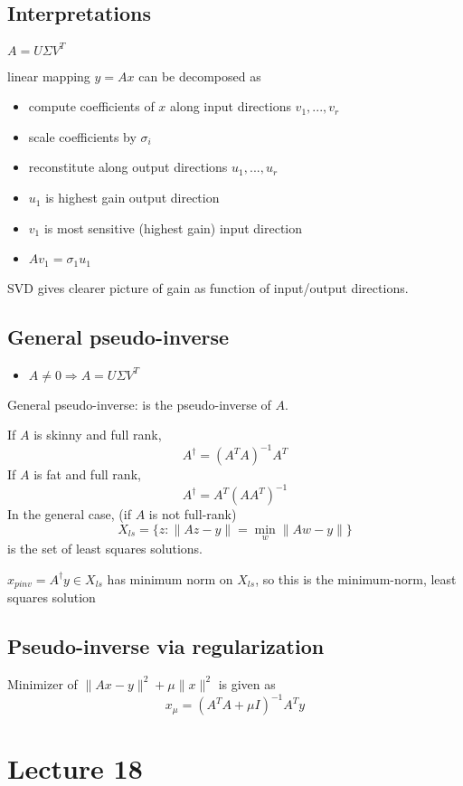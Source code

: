 \documentclass[10pt,letterpaper]{article}
\begin{document}
\subsection{Interpretations}
\label{sec-16_3}

$A = U \Sigma V ^{T}$

linear mapping $y=Ax$ can be decomposed as
\begin{itemize}
\item compute coefficients of $x$ along input directions $v_1,...,v_r$
\item scale coefficients by $\sigma _{i}$
\item reconstitute along output directions $u _{1} ,..., u _{r}$
\item $u _{1}$ is highest gain output direction
\item $v_1$ is most sensitive (highest gain) input direction
\item $A v_1 = \sigma_1 u_1$
\end{itemize}

SVD gives clearer picture of gain as function of input/output directions.
\subsection{General pseudo-inverse}
\label{sec-16_4}

\begin{itemize}
\item $A\ne 0\Rightarrow A=U\Sigma V ^{T}$
\end{itemize}
General pseudo-inverse:  is the pseudo-inverse of $A$.

If $A$ is skinny and full rank,
$$
A ^{\dagger} = (A ^{T} A) ^{-1} A ^{T} 
$$
If $A$ is fat and full rank,
$$
A ^{\dagger} = A ^{T} (AA ^{T}) ^{-1} 
$$
In the general case, (if $A$ is not full-rank)
$$
X _{ls} = \{ z: \|Az-y\|= \min _{w} \|Aw-y\| \}
$$
is the set of least squares solutions.

$x _{pinv} = A ^{\dagger} y\in X _{ls}$ has minimum norm on $X _{ls}$, so this is the minimum-norm, least squares solution
\subsection{Pseudo-inverse via regularization}
\label{sec-16_5}

Minimizer of $\|Ax-y\| ^{2} + \mu \|x\| ^{2}$ is given as
$$
x _{\mu} = (A ^{T} A + \mu I) ^{-1} A ^{T} y
$$
\section{Lecture 18}
\label{sec-17}
\end{document}
